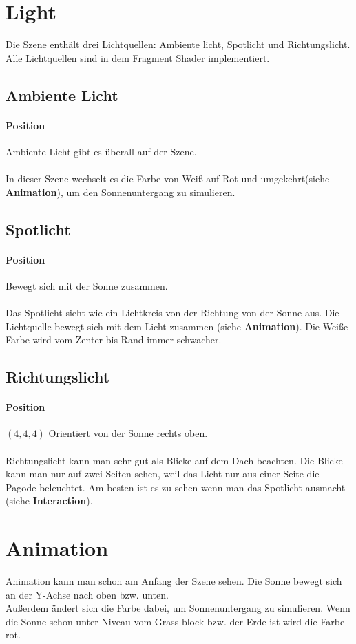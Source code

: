 \documentclass[12pt]{article}
\begin{document}
\pagebreak
\section{Light}
Die Szene enthält drei Lichtquellen: Ambiente licht, Spotlicht und Richtungslicht.
Alle Lichtquellen sind in dem Fragment Shader implementiert.
\subsection{Ambiente Licht}
\paragraph{Position} Ambiente Licht gibt es überall auf der Szene. \\\\
In dieser Szene wechselt es die Farbe von Weiß auf Rot und umgekehrt(siehe \textbf{Animation}), um den Sonnenuntergang zu simulieren.
\subsection{Spotlicht}
\paragraph{Position} Bewegt sich mit der Sonne zusammen.\\\\ 
Das Spotlicht sieht wie ein Lichtkreis von der Richtung von der Sonne aus. Die Lichtquelle bewegt sich mit dem Licht zusammen (siehe \textbf{Animation}).
Die Weiße Farbe wird vom Zenter bis Rand immer schwacher. 
\subsection{Richtungslicht}
\paragraph{Position} $(4,4,4)$ Orientiert von der Sonne rechts oben.\\\\ 
Richtungslicht kann man sehr gut als Blicke auf dem Dach beachten. Die Blicke kann man nur auf zwei Seiten sehen, weil das Licht nur aus einer Seite die Pagode beleuchtet. Am besten ist es zu sehen wenn man das Spotlicht ausmacht (siehe \textbf{Interaction}).

\pagebreak

\section{Animation}
Animation kann man schon am Anfang der Szene sehen. Die Sonne bewegt sich an der Y-Achse nach oben bzw. unten. \\
Außerdem ändert sich die Farbe dabei, um Sonnenuntergang zu simulieren.
Wenn die Sonne schon unter Niveau vom Grass-block bzw. der Erde ist wird die Farbe rot.
\end{document}
